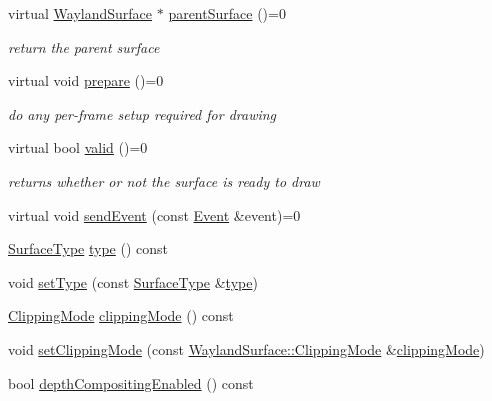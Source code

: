 \begin{DoxyCompactItemize}
virtual \hyperlink{classmotorcar_1_1WaylandSurface}{Wayland\-Surface} $\ast$ \hyperlink{classmotorcar_1_1WaylandSurface_a94b48df54c92d9046f786d4d7f5d4ff2}{parent\-Surface} ()=0
\begin{DoxyCompactList}\small\item\em return the parent surface \end{DoxyCompactList}\item 
virtual void \hyperlink{classmotorcar_1_1WaylandSurface_a63669771c03ce580fec8a0099dbd294e}{prepare} ()=0
\begin{DoxyCompactList}\small\item\em do any per-\/frame setup required for drawing \end{DoxyCompactList}\item 
virtual bool \hyperlink{classmotorcar_1_1WaylandSurface_af2f54076ec690f4d478771183c9b0db5}{valid} ()=0
\begin{DoxyCompactList}\small\item\em returns whether or not the surface is ready to draw \end{DoxyCompactList}\item 
virtual void \hyperlink{classmotorcar_1_1WaylandSurface_a8d709e7d02ee7f7b8b3343590e518993}{send\-Event} (const \hyperlink{classmotorcar_1_1Event}{Event} \&event)=0
\item 
\hyperlink{classmotorcar_1_1WaylandSurface_a7715a41b6776800656722407ec01e0a5}{Surface\-Type} \hyperlink{classmotorcar_1_1WaylandSurface_a0e6e5e2455666f607a8ddb2479ba8e88}{type} () const 
\item 
void \hyperlink{classmotorcar_1_1WaylandSurface_a8806b03b3c4007578f26c1b907303336}{set\-Type} (const \hyperlink{classmotorcar_1_1WaylandSurface_a7715a41b6776800656722407ec01e0a5}{Surface\-Type} \&\hyperlink{classmotorcar_1_1WaylandSurface_a0e6e5e2455666f607a8ddb2479ba8e88}{type})
\item 
\hyperlink{classmotorcar_1_1WaylandSurface_ab48793c19a30e8ad689fb4465cd27a70}{Clipping\-Mode} \hyperlink{classmotorcar_1_1WaylandSurface_add06f923d4bd62b3b3cb25d1e5f0ba0c}{clipping\-Mode} () const 
\item 
void \hyperlink{classmotorcar_1_1WaylandSurface_ae0dcd1e480055dceb919b242089b59cb}{set\-Clipping\-Mode} (const \hyperlink{classmotorcar_1_1WaylandSurface_ab48793c19a30e8ad689fb4465cd27a70}{Wayland\-Surface\-::\-Clipping\-Mode} \&\hyperlink{classmotorcar_1_1WaylandSurface_add06f923d4bd62b3b3cb25d1e5f0ba0c}{clipping\-Mode})
\item 
bool \hyperlink{classmotorcar_1_1WaylandSurface_a09cb70e037726ac4ee36c2aac9be30ae}{depth\-Compositing\-Enabled} () const 

\end{DoxyCompactItemize}
